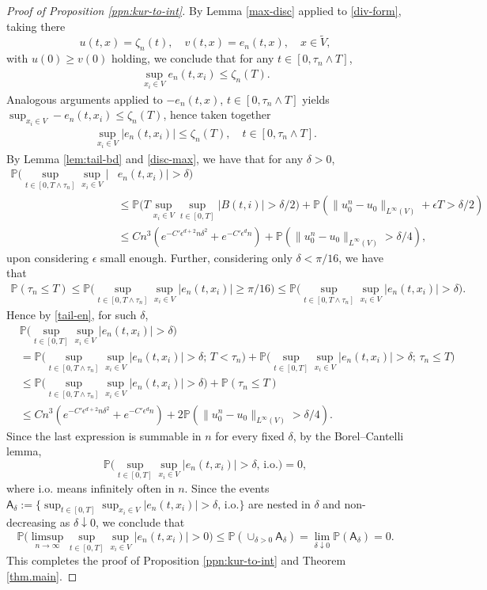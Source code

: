 \documentclass[a4paper,11pt]{amsart}
\renewcommand{\P}{\mathbb{P}}
\newcommand{\ep}{\epsilon}
\numberwithin{equation}{section}
\numberwithin{theorem}{section}
\theoremstyle{definition}
\begin{document}
\begin{proof}[Proof of Proposition \ref{ppn:kur-to-int}]
By Lemma \ref{max-disc} applied to \eqref{div-form}, taking there 
\[
u(t,x)=\zeta_n(t), \quad v(t,x)=e_n(t,x), \quad x\in \tilde V,
\]
with $u(0)\ge v(0)$ holding, we conclude that for any $t\in[0,\tau_n\wedge T]$,
\begin{align*}
\sup_{x_i\in V}e_n(t,x_i)\le  \zeta_{n}(T).
\end{align*}
Analogous arguments applied to $-e_n(t,x)$, $t\in[0,\tau_n\wedge T]$ yields $\sup_{x_i\in V}-e_n(t,x_i)\le  \zeta_{n}(T)
$, hence taken together
\begin{align}\label{disc-max}
\sup_{x_i\in V}|e_n(t,x_i)|\le \zeta_{n}(T), \quad t\in[0,\tau_n\wedge T].
\end{align}
By Lemma \ref{lem:tail-bd} and \eqref{disc-max}, we have that for any $\delta>0$,
\begin{align}\label{tail-en}
\P\Big(\sup_{t\in[0,T\wedge \tau_n]}\sup_{x_i\in V}| & e_n(t,x_i)|>\delta\Big) \nonumber\\
& \le \P\Big(T\sup_{x_i\in V}\sup_{t\in[0,T]} |B(t,i)| >\delta/2\Big) + \P\left(\|u^n_0 - u_0\|_{L^\infty(V)} +\ep T > \delta/2 \right)\nonumber\\
& \le Cn^{3}\left(e^{-C'\ep^{d+2} n \delta^2}+e^{-C'\ep^dn}\right) + \P\left(\|u^n_0 - u_0\|_{L^\infty(V)} > \delta/4 \right),
\end{align}
upon considering $\ep$ small enough. Further, considering only $\delta<\pi/16$, we have that
\begin{align*}
\P(\tau_n\le T)\le \P\Big(\sup_{t\in[0,T\wedge \tau_n]}\sup_{x_i\in V}|e_n(t,x_i)|\ge\pi/16\Big)\le \P\Big(\sup_{t\in[0,T\wedge \tau_n]}\sup_{x_i\in V}|e_n(t,x_i)|>\delta\Big).
\end{align*}
Hence by \eqref{tail-en}, for such $\delta$, %
\begin{align}\label{summable}
&\P\Big(\sup_{t\in[0,T]}\sup_{x_i\in V}|e_n(t,x_i)|>\delta\Big)\nonumber\\
&=\P\Big(\sup_{t\in[0,T\wedge\tau_n]}\sup_{x_i\in V}|e_n(t,x_i)|>\delta;\, T<\tau_n\Big)+\P\Big(\sup_{t\in[0,T]}\sup_{x_i\in V}|e_n(t,x_i)|>\delta;\, \tau_n\le T\Big)\nonumber\\
&\le \P\Big(\sup_{t\in[0,T\wedge \tau_n]}\sup_{x_i\in V}|e_n(t,x_i)|>\delta\Big)+\P(\tau_n\le T)\nonumber\\
&\le Cn^{3}\left(e^{-C'\ep^{d+2} n \delta^2}+e^{-C'\ep^dn}\right) + 2\P\left(\|u^n_0 - u_0\|_{L^\infty(V)} > \delta/4 \right).
\end{align}
Since the last expression is summable in $n$ for every fixed $\delta$, by the Borel--Cantelli lemma, 
\[
\P\Big(\sup_{t\in[0,T]}\sup_{x_i\in V}|e_n(t,x_i)|>\delta, \, \text{i.o.}\Big)=0,
\]
where i.o. means infinitely often in $n$. 
Since the events $\mathsf A_\delta:=\big\{\sup_{t\in[0,T]}\sup_{x_i\in V}|e_n(t,x_i)|>\delta, \,  \text{i.o.}\big\}$ are nested in $\delta$ and non-decreasing as $\delta\downarrow 0$, we conclude that 
\[
\P\Big(\limsup_{n\to\infty}\sup_{t\in[0,T]}\sup_{x_i\in V}|e_n(t,x_i)|>0\Big) \le \P(\cup_{\delta>0}\mathsf A_\delta)
= \lim_{\delta\downarrow 0}\P(\mathsf A_\delta)=0.
\]
This completes the proof of Proposition \ref{ppn:kur-to-int} and Theorem \ref{thm.main}.
\end{proof}
\end{document}
